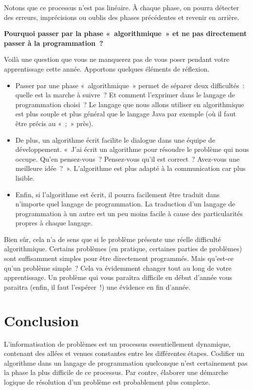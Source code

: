 		Notons que ce processus n’est pas linéaire. À chaque
		phase, on pourra détecter des erreurs, imprécisions ou oublis des
		phases précédentes et revenir en arrière.
	
		\textbf{Pourquoi passer par la phase «~algorithmique~» 
			et ne pas directement passer à la programmation~?}
		
		Voilà une question que vous ne manquerez pas de vous poser 
		pendant votre apprentissage cette année. 
		Apportons quelques éléments de réflexion.
	
		\begin{itemize}
		\item
			Passer par une phase «~algorithmique~» 
			permet de séparer deux difficultés~:~
			quelle est la marche à suivre~? 
			Et comment l’exprimer dans le langage de programmation choisi~? 
			Le langage que nous allons utiliser en algorithmique 
			est plus souple et plus général que le langage Java
			par exemple (où il faut être précis au «~;~» près).
		\item
			De plus, un algorithme écrit facilite le dialogue 
			dans une équipe de développement. 
			«~J’ai écrit un algorithme 
			pour résoudre le problème qui nous occupe. 
			Qu’en pensez-vous~? Pensez-vous qu’il est correct~?
			Avez-vous une meilleure idée~?~». 
			L’algorithme est plus adapté à la communication car plus lisible.
		\item
			Enfin, si l’algorithme est écrit, 
			il pourra facilement être traduit
			dans n’importe quel langage de programmation. 
			La traduction d’un langage de programmation à un autre
			est un peu moins facile 
			à cause des particularités propres à chaque langage.
		\end{itemize}
	
		Bien sûr, cela n’a de sens que si le problème présente
		une réelle difficulté algorithmique. 
		Certains problèmes (en pratique, certaines parties de problèmes) 
		sont suffisamment simples pour être directement programmés. 
		Mais qu’est-ce qu’un problème simple~? 
		Cela va évidemment changer tout au long de votre apprentissage. 
		Un problème qui vous paraitra difficile en début d’année 
		vous paraitra (enfin, il faut l’espérer~!) 
		une évidence en fin d’année.
	
	\section{Conclusion}
	
		L’informatisation de problèmes 
		est un processus essentiellement dynamique, 
		contenant des allées et venues constantes 
		entre les différentes étapes. 
		Codifier un algorithme dans un langage de programmation quelconque 
		n’est certainement pas la phase la plus difficile de ce processus. 
		Par contre, élaborer une démarche logique de résolution 
		d’un problème est probablement plus complexe.
		
